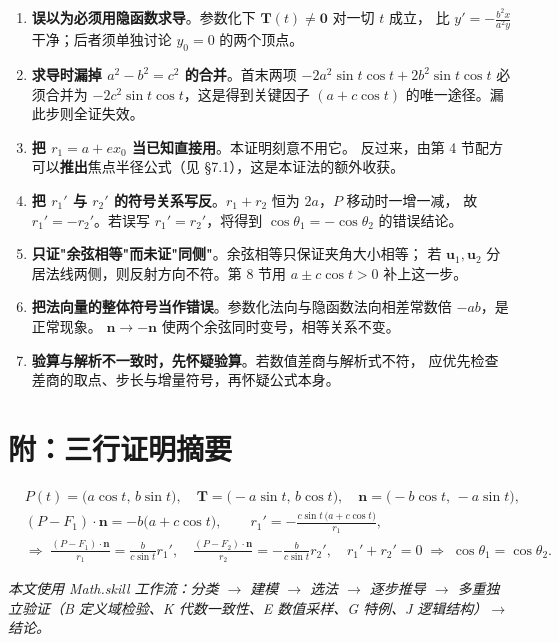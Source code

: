 \documentclass[11pt]{ctexart}
\newcommand{\uu}{\mathbf{u}}
\begin{document}
\begin{enumerate}
\item \textbf{误以为必须用隐函数求导}。参数化下 $\mathbf{T}(t)\neq\mathbf{0}$ 对一切 $t$ 成立，
比 $y'=-\frac{b^{2}x}{a^{2}y}$ 干净；后者须单独讨论 $y_{0}=0$ 的两个顶点。

\item \textbf{求导时漏掉 $a^{2}-b^{2}=c^{2}$ 的合并}。首末两项 $-2a^{2}\sin t\cos t+2b^{2}\sin t\cos t$
必须合并为 $-2c^{2}\sin t\cos t$，这是得到关键因子 $(a+c\cos t)$ 的唯一途径。漏此步则全证失效。

\item \textbf{把 $r_{1}=a+ex_{0}$ 当已知直接用}。本证明刻意不用它。
反过来，由第 4 节配方可以\textbf{推出}焦点半径公式（见 \S7.1），这是本证法的额外收获。

\item \textbf{把 $r_{1}'$ 与 $r_{2}'$ 的符号关系写反}。$r_{1}+r_{2}$ 恒为 $2a$，$P$ 移动时一增一减，
故 $r_{1}'=-r_{2}'$。若误写 $r_{1}'=r_{2}'$，将得到 $\cos\theta_{1}=-\cos\theta_{2}$ 的错误结论。

\item \textbf{只证"余弦相等"而未证"同侧"}。余弦相等只保证夹角大小相等；
若 $\uu_{1},\uu_{2}$ 分居法线两侧，则反射方向不符。第 8 节用 $a\pm c\cos t>0$ 补上这一步。

\item \textbf{把法向量的整体符号当作错误}。参数化法向与隐函数法向相差常数倍 $-ab$，是正常现象。
$\mathbf{n}\to-\mathbf{n}$ 使两个余弦同时变号，相等关系不变。

\item \textbf{验算与解析不一致时，先怀疑验算}。若数值差商与解析式不符，
应优先检查差商的取点、步长与增量符号，再怀疑公式本身。
\end{enumerate}

\section*{附：三行证明摘要}

\begin{keybox}
\begin{align*}
&P(t)=\bigl(a\cos t,\,b\sin t\bigr),\quad
\mathbf{T}=\bigl(-a\sin t,\,b\cos t\bigr),\quad
\mathbf{n}=\bigl(-b\cos t,\,-a\sin t\bigr),\\[3pt]
&(P-F_{1})\cdot\mathbf{n}=-b\bigl(a+c\cos t\bigr),\qquad
r_{1}'=-\frac{c\sin t\,\bigl(a+c\cos t\bigr)}{r_{1}},\\[3pt]
&\Longrightarrow\;
\frac{(P-F_{1})\cdot\mathbf{n}}{r_{1}}=\frac{b}{c\sin t}r_{1}',
\quad
\frac{(P-F_{2})\cdot\mathbf{n}}{r_{2}}=-\frac{b}{c\sin t}r_{2}',
\quad
r_{1}'+r_{2}'=0
\;\Longrightarrow\;\cos\theta_{1}=\cos\theta_{2}.
\end{align*}
\end{keybox}

\vspace{0.4cm}
{\small\textit{本文使用 Math.skill 工作流：分类 $\to$ 建模 $\to$ 选法 $\to$ 逐步推导 $\to$
多重独立验证（B 定义域检验、K 代数一致性、E 数值采样、G 特例、J 逻辑结构）$\to$ 结论。}}
\end{document}
